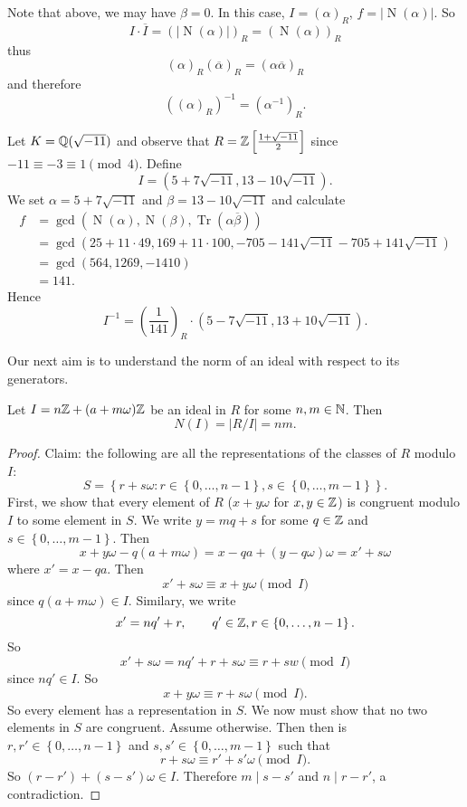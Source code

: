 Note that above, we may have $\beta = 0$.
In this case, $I = (\alpha)_R$, 
$f = \left\lvert \operatorname{N}(\alpha) \right\rvert$.
So \[
	I \cdot \overline I
	= \left( \left\lvert \operatorname{N}(\alpha) \right\rvert \right)_R
	= \left( \operatorname{N}(\alpha) \right)_R
\]
thus
\[
	(\alpha)_R (\overline\alpha)_R
	= (\alpha\overline\alpha)_R
\]
and therefore
\[
	\left( (\alpha)_R \right)^{-1}
	= \left( \alpha^{-1} \right)_R.
\]

\begin{example}[]
	Let $K = \mathbb{Q}(\sqrt{-11})$ and observe that
	$R = \mathbb{Z}\left[\frac{1 + \sqrt{-11}}2\right]$
	since $-11 \equiv -3 \equiv 1 \pmod 4$.
	Define
	\[
		I = (5 + 7\sqrt{-11}, 13 - 10\sqrt{-11}).
	\]
	We set $\alpha = 5 + 7\sqrt{-11}$ and
	$\beta = 13 - 10\sqrt{-11}$
	and calculate
	\begin{align*}
		f
		&= \gcd(\operatorname{N}(\alpha),
		\operatorname{N}(\beta),
		\operatorname{Tr}(\alpha\overline\beta)) \\
		&= \gcd(25 + 11\cdot49,
		169 + 11\cdot100,
		-705-141\sqrt{-11} -705 + 141\sqrt{-11}) \\
		&= \gcd(564,1269,-1410) \\
		&= 141.
	\end{align*}
	Hence
	\[
		I^{-1} = \left( \frac1{141} \right)_R \cdot
		\left(5 - 7\sqrt{-11}, 13 + 10\sqrt{-11}\right).
	\]
\end{example}

Our next aim is to understand the norm of an ideal with respect to its
generators.

\begin{lemma}[]
	Let $I = n\mathbb{Z} + (a + m\omega) \mathbb{Z}$ be an ideal in $R$ for some
	$n,m \in \mathbb{N}$.
	Then
	\[
		N(I) = \left\lvert R/I \right\rvert = nm.
	\]
\end{lemma}

\begin{proof}
	Claim: the following are all the representations of the classes
	of $R$ modulo $I$:
	\[
		S = \left\{
			r + s\omega:
			r \in \left\{
				0, \ldots, n-1
			\right\},
			s \in \left\{
				0, \ldots, m-1
			\right\}
		\right\}.
	\]
	First, we show that every element of $R$ ($x + y\omega$
	for $x, y \in \mathbb{Z}$) is congruent modulo $I$ to some element in $S$.
	We write $y = mq + s$ for some $q \in \mathbb{Z}$ and
	$s \in \left\{
		0, \ldots, m-1
	\right\}$.
	Then
	\[
		x + y\omega - q(a + m\omega) 
		= x - qa + (y - q \omega) \omega
		= x' + s\omega
	\]
	where $x' = x - qa$.
	Then
	\[
		x' + s\omega \equiv x + y \omega \pmod I
	\]
	since $q(a + m\omega) \in I$.
	Similary, we write
	\[
		x' = nq' + r, \qquad q' \in \mathbb{Z}, r \in \left\{
			0, \ldots,n-1
		\right\}.
	\]
	So
	\[
		x' + s\omega = nq' + r + s\omega \equiv r + sw \pmod I
	\]
	since $nq' \in I$.
	So
	\[
		x + y\omega \equiv r + s\omega \pmod I.
	\]
	So every element has a representation in $S$.
	We now must show that no two elements in $S$ are congruent.
	Assume otherwise.
	Then then is $r, r' \in \left\{
		0, \ldots,n-1
	\right\}$
	and $s, s' \in \left\{
		0, \ldots, m-1
	\right\}$
	such that
	\[
		r + s\omega \equiv r' + s'\omega \pmod I.
	\]
	So $(r - r') + (s - s') \omega \in I$.
	Therefore $m \mid s - s'$ and $n \mid r - r'$,
	a contradiction.
\end{proof}


